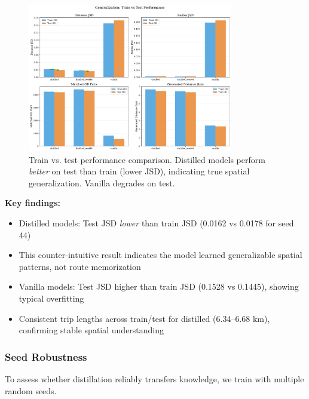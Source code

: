 \begin{figure}[h]
    \centering
    \includegraphics[width=0.8\textwidth]{assets/plots/hoser/train_test_comparison.pdf}
    \caption{Train vs. test performance comparison. Distilled models perform \emph{better} on test than train (lower JSD), indicating true spatial generalization. Vanilla degrades on test.}
    \label{fig:train-test}
\end{figure}

\textbf{Key findings:}
\begin{itemize}[noitemsep,topsep=0pt]
    \item Distilled models: Test JSD \emph{lower} than train JSD (0.0162 vs 0.0178 for seed 44)
    \item This counter-intuitive result indicates the model learned generalizable spatial patterns, not route memorization
    \item Vanilla models: Test JSD higher than train JSD (0.1528 vs 0.1445), showing typical overfitting
    \item Consistent trip lengths across train/test for distilled (6.34--6.68 km), confirming stable spatial understanding
\end{itemize}

\subsubsection{Seed Robustness}

To assess whether distillation reliably transfers knowledge, we train with multiple random seeds.

